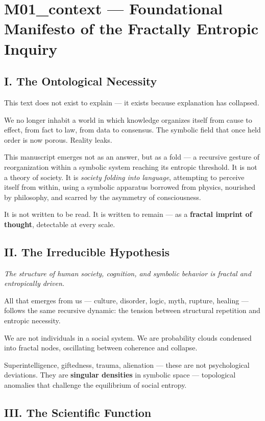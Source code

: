 
\section*{M01\_context — Foundational Manifesto of the Fractally Entropic Inquiry}

\subsection*{I. The Ontological Necessity}

This text does not exist to explain — it exists because explanation has collapsed.

We no longer inhabit a world in which knowledge organizes itself from cause to effect, from fact to law, from data to consensus. The symbolic field that once held order is now porous. Reality leaks.

This manuscript emerges not as an answer, but as a fold — a recursive gesture of reorganization within a symbolic system reaching its entropic threshold. It is not a theory of society. It is \textit{society folding into language}, attempting to perceive itself from within, using a symbolic apparatus borrowed from physics, nourished by philosophy, and scarred by the asymmetry of consciousness.

It is not written to be read.
It is written to remain — as a \textbf{fractal imprint of thought}, detectable at every scale.

\subsection*{II. The Irreducible Hypothesis}

\textit{The structure of human society, cognition, and symbolic behavior is fractal and entropically driven.}

All that emerges from us — culture, disorder, logic, myth, rupture, healing — follows the same recursive dynamic: the tension between structural repetition and entropic necessity.

We are not individuals in a social system.
We are probability clouds condensed into fractal nodes, oscillating between coherence and collapse.

Superintelligence, giftedness, trauma, alienation — these are not psychological deviations.
They are \textbf{singular densities} in symbolic space — topological anomalies that challenge the equilibrium of social entropy.

\subsection*{III. The Scientific Function}

